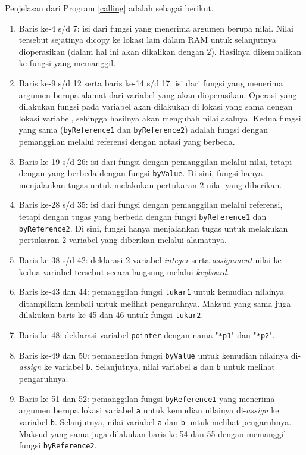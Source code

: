 Penjelasan dari Program \ref{calling} adalah sebagai berikut.
\begin{enumerate}
\item Baris ke-4 s/d 7: isi dari fungsi yang menerima argumen berupa nilai. Nilai tersebut sejatinya dicopy ke lokasi lain dalam RAM untuk selanjutnya dioperasikan (dalam hal ini akan dikalikan dengan $2$). Hasilnya dikembalikan ke fungsi yang memanggil.
\item Baris ke-9 s/d 12 serta baris ke-14 s/d 17: isi dari fungsi yang menerima argumen berupa alamat dari variabel yang akan dioperasikan. Operasi yang dilakukan fungsi pada variabel akan dilakukan di lokasi yang sama dengan lokasi variabel, sehingga hasilnya akan mengubah nilai asalnya. Kedua fungsi yang sama (\texttt{byReference1} dan \texttt{byReference2}) adalah fungsi dengan pemanggilan melalui referensi dengan notasi yang berbeda.
\item Baris ke-19 s/d 26: isi dari fungsi dengan pemanggilan melalui nilai, tetapi dengan yang berbeda dengan fungsi \texttt{byValue}. Di sini, fungsi hanya menjalankan tugas untuk melakukan pertukaran $2$ nilai yang diberikan.
\item Baris ke-28 s/d 35: isi dari fungsi dengan pemanggilan melalui referensi, tetapi dengan tugas yang berbeda dengan fungsi \texttt{byReference1} dan \texttt{byReference2}. Di sini, fungsi hanya menjalankan tugas untuk melakukan pertukaran $2$ variabel yang diberikan melalui alamatnya.
\item Baris ke-38 s/d 42: deklarasi 2 variabel \textit{integer} serta \textit{assignment} nilai ke kedua variabel tersebut secara langsung melalui \textit{keyboard}.
\item Baris ke-43 dan 44: pemanggilan fungsi \texttt{tukar1} untuk kemudian nilainya ditampilkan kembali untuk melihat pengaruhnya. Maksud yang sama juga dilakukan baris ke-45 dan 46 untuk fungsi \texttt{tukar2}.
\item Baris ke-48: deklarasi variabel \texttt{pointer} dengan nama "\texttt{*p1}" dan "\texttt{*p2}".
\item Baris ke-49 dan 50: pemanggilan fungsi \texttt{byValue} untuk kemudian nilainya di-\textit{assign} ke variabel \texttt{b}. Selanjutnya, nilai variabel \texttt{a} dan \texttt{b} untuk melihat pengaruhnya. 
\item Baris ke-51 dan 52: pemanggilan fungsi \texttt{byReference1} yang menerima argumen berupa lokasi variabel \texttt{a} untuk kemudian nilainya di-\textit{assign} ke variabel \texttt{b}. Selanjutnya, nilai variabel \texttt{a} dan \texttt{b} untuk melihat pengaruhnya. Maksud yang sama juga dilakukan baris ke-54 dan 55 dengan memanggil fungsi \texttt{byReference2}.

\end{enumerate}
